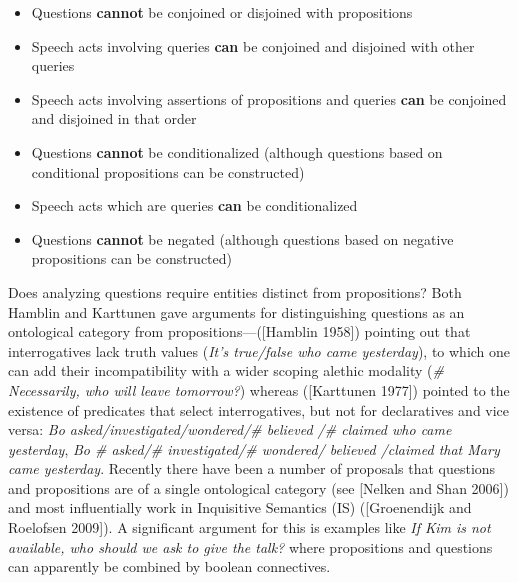 \documentclass[12pt]{article}
\newcommand{\ignore}[1]{}
\begin{document}
{\begin{itemize}
\item Questions \textbf{cannot} be conjoined or disjoined with
  propositions

\item Speech acts involving queries \textbf{can} be conjoined and
  disjoined with other queries

\item Speech acts involving assertions of propositions and queries
  \textbf{can} be conjoined and disjoined in that order

\item Questions \textbf{cannot} be conditionalized (although questions
  based on conditional propositions can be constructed)

\item Speech acts which are queries \textbf{can} be conditionalized

\item Questions \textbf{cannot} be negated (although questions based
  on negative propositions can be constructed)

\ignore{\item Speech acts which are queries (or any other speech acts)
  \textbf{cannot} be negated.  That is, \textit{Isn't he quite smart?}
  cannot mean ``I'm not asking you whether he is smart''.
 }
\end{itemize} 
}


Does analyzing questions require entities distinct from propositions?
Both Hamblin and Karttunen gave arguments for distinguishing questions
as an ontological category from propositions---([Hamblin 1958]\ignore{\cite{hamblin58}})
pointing out that interrogatives lack truth values (\textit{It's true/false who came yesterday}), to which one
can add their incompatibility with a wider scoping alethic modality
(\textit{\# Necessarily, who will leave tomorrow?}) whereas ([Karttunen 1977]\ignore{\cite{kartt77}})
pointed to the existence of predicates that select interrogatives, but
not for declaratives and vice
versa:
\textit{Bo asked/investigated/wondered/\# believed /\# claimed who came
yesterday},  \textit{Bo \# asked/\# investigated/\# wondered/ believed
/claimed that Mary came yesterday}.
Recently there have been a number of proposals that questions and propositions are of
a single ontological category%
(see [Nelken and Shan 2006]\ignore{\cite{nelken-francez,nelken-shan06}}) and most influentially work
in Inquisitive Semantics (IS) ([Groenendijk and Roelofsen 2009]\ignore{\cite{groenendijk09}}).  A significant
argument for this is examples like \textit{If Kim is not available,
  who should we ask to give the talk?} where propositions and
questions can apparently be combined by boolean connectives.
\end{document}
